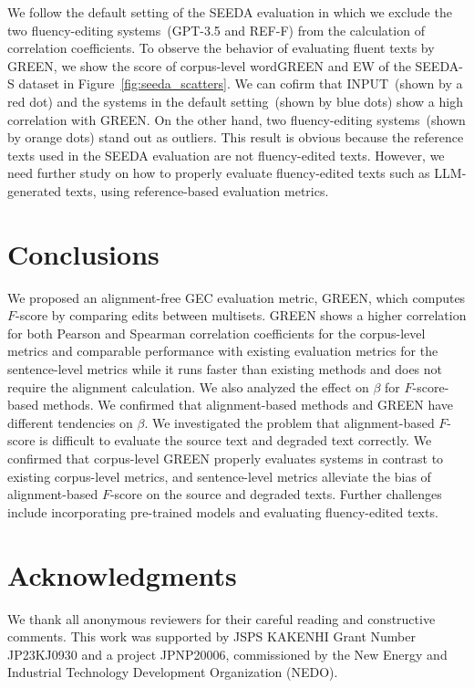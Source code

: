 \documentclass[11pt]{article}
\begin{document}
We follow the default setting of the SEEDA evaluation in which we exclude the two fluency-editing systems~(\textsf{GPT-3.5} and \textsf{REF-F}) from the calculation of correlation coefficients.
To observe the behavior of evaluating fluent texts by GREEN, we show the score of corpus-level wordGREEN and EW of the SEEDA-S dataset in Figure~\ref{fig:seeda_scatters}.
We can cofirm that \textsf{INPUT}~(shown by a red dot) and the systems in the default setting~(shown by blue dots) show a high correlation with GREEN.
On the other hand, two fluency-editing systems~(shown by orange dots) stand out as outliers.
This result is obvious because the reference texts used in the SEEDA evaluation are not fluency-edited texts.
However, we need further study on how to properly evaluate fluency-edited texts such as LLM-generated texts, using reference-based evaluation metrics.

\section{Conclusions}
\label{sec:conclusion}

We proposed an alignment-free GEC evaluation metric, GREEN, which computes $F$-score by comparing edits between multisets.
GREEN shows a higher correlation for both Pearson and Spearman correlation coefficients for the corpus-level metrics and comparable performance with existing evaluation metrics for the sentence-level metrics while it runs faster than existing methods and does not require the alignment calculation.
We also analyzed the effect on $\beta$ for $F$-score-based methods.
We confirmed that alignment-based methods and GREEN have different tendencies on $\beta$.
We investigated the problem that alignment-based $F$-score is difficult to evaluate the source text and degraded text correctly.
We confirmed that corpus-level GREEN properly evaluates systems in contrast to existing corpus-level metrics, and sentence-level metrics alleviate the bias of alignment-based $F$-score on the source and degraded texts.
Further challenges include incorporating pre-trained models and evaluating fluency-edited texts.

\section*{Acknowledgments}

We thank all anonymous reviewers for their careful reading and constructive comments.
This work was supported by JSPS KAKENHI Grant Number JP23KJ0930 and a project JPNP20006, commissioned by the New Energy and Industrial Technology Development Organization (NEDO).
\end{document}
